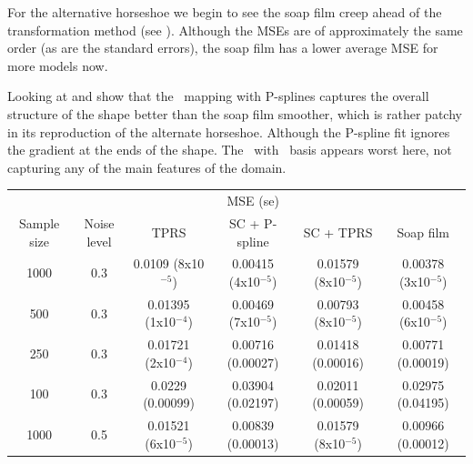 For the alternative horseshoe we begin to see the soap film creep ahead of the transformation method (see ). Although the MSEs are of approximately the same order (as are the standard errors), the soap film has a lower average MSE for more models now. 

Looking at  and show that the \sch\ mapping with P-splines captures the overall structure of the shape better than the soap film smoother, which is rather patchy in its reproduction of the alternate horseshoe. Although the P-spline fit ignores the gradient at the ends of the shape. The \sch\ with \tprs\ basis appears worst here, not capturing any of the main features of the domain.

\begin{table}[ht]
\begin{tabular}{c c c c c c}\\
& & & MSE (se) &\\
Sample size & Noise level & TPRS & SC + P-spline& SC + TPRS & Soap film\\
\hline
\hline
1000 & 0.3 & 0.0109 (8x10$^{-5}$) & 0.00415 (4x10$^{-5}$) & 0.01579 (8x10$^{-5}$) & 0.00378 (3x10$^{-5}$) \\ 
500 & 0.3 & 0.01395 (1x10$^{-4}$) & 0.00469 (7x10$^{-5}$) & 0.00793 (8x10$^{-5}$) & 0.00458 (6x10$^{-5}$) \\ 
250 & 0.3 & 0.01721 (2x10$^{-4}$) & 0.00716 (0.00027) & 0.01418 (0.00016) & 0.00771 (0.00019) \\ 
100 & 0.3 & 0.0229 (0.00099) & 0.03904 (0.02197) & 0.02011 (0.00059) & 0.02975 (0.04195) \\ 
1000 & 0.5 & 0.01521 (6x10$^{-5}$) & 0.00839 (0.00013) & 0.01579 (8x10$^{-5}$) & 0.00966 (0.00012) \\ 

\end{tabular}
\end{table}
